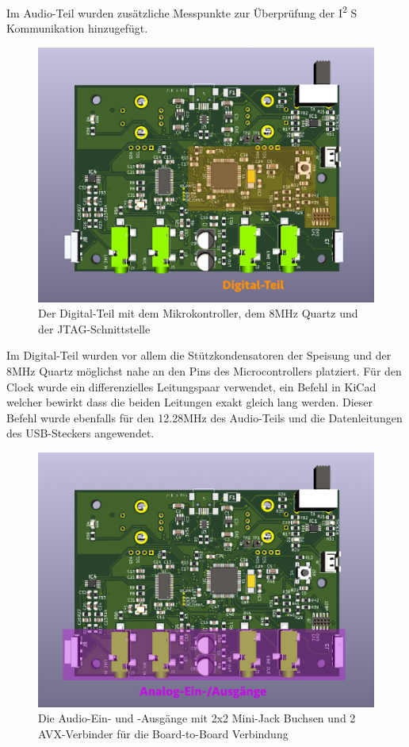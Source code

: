 Im Audio-Teil wurden zusätzliche Messpunkte zur Überprüfung der I\textsuperscript{2} S Kommunikation hinzugefügt. 

\begin{figure} [H]
\begin{center}
 \includegraphics[scale=0.37]{../graphics/PCB-Layout_DGTL.jpg}
 \caption{Der Digital-Teil mit dem Mikrokontroller, dem 8MHz Quartz und der JTAG-Schnittstelle}
\label{fig:PCB_DGTL}
\end{center}
\end{figure}

Im Digital-Teil wurden vor allem die Stützkondensatoren der Speisung und der 8MHz Quartz möglichst nahe an den Pins des Microcontrollers platziert. Für den Clock wurde ein differenzielles Leitungspaar verwendet, ein Befehl in KiCad welcher bewirkt dass die beiden Leitungen exakt gleich lang werden. Dieser Befehl wurde ebenfalls für den 12.28MHz des Audio-Teils und die Datenleitungen des USB-Steckers angewendet.

\begin{figure} [H]
\begin{center}
 \includegraphics[scale=0.37]{../graphics/PCB-Layout_INOUT.jpg}
 \caption{Die Audio-Ein- und -Ausgänge mit 2x2 Mini-Jack Buchsen und 2 AVX-Verbinder für die Board-to-Board Verbindung}
\label{fig:PCB_INOUT}
\end{center}
\end{figure}

